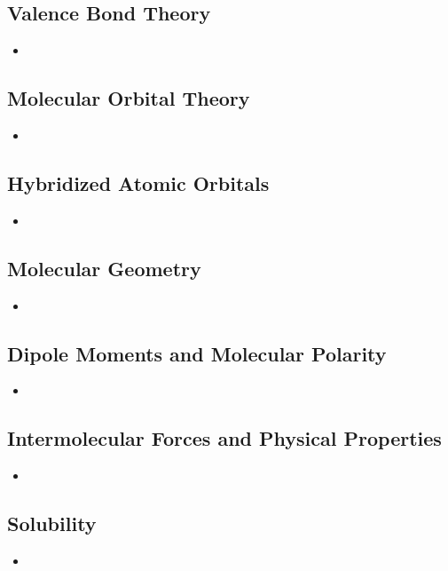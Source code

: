 \documentclass[12pt,a4paper]{article}
\begin{document}
\subsection{Valence Bond Theory}
\begin{itemize}
    \item 
\end{itemize}

\subsection{Molecular Orbital Theory}
\begin{itemize}
    \item 
\end{itemize}

\subsection{Hybridized Atomic Orbitals}
\begin{itemize}
    \item 
\end{itemize}

\subsection{Molecular Geometry}
\begin{itemize}
    \item 
\end{itemize}

\subsection{Dipole Moments and Molecular Polarity}
\begin{itemize}
    \item 
\end{itemize}

\subsection{Intermolecular Forces and Physical Properties}
\begin{itemize}
    \item 
\end{itemize}

\subsection{Solubility}
\begin{itemize}
    \item 
\end{itemize}
\end{document}
